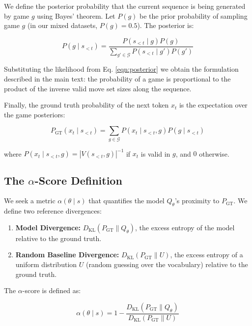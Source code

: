 \documentclass{article}
\theoremstyle{plain}
\theoremstyle{definition}
\theoremstyle{remark}
\begin{document}
We define the posterior probability that the current sequence is being generated by game $g$ using Bayes' theorem. Let $P(g)$ be the prior probability of sampling game $g$ (in our mixed datasets, $P(g) = 0.5$). The posterior is:

\begin{equation}
    P(g \mid s_{<t}) = \frac{P(s_{<t} \mid g) P(g)}{\sum_{g' \in \mathcal{G}} P(s_{<t} \mid g') P(g')}
    \label{eqn:posterior}
\end{equation}

Substituting the likelihood from Eq. \ref{eqn:posterior} we obtain the formulation described in the main text: the probability of a game is proportional to the product of the inverse valid move set sizes along the sequence.

Finally, the ground truth probability of the next token $x_t$ is the expectation over the game posteriors:

\begin{equation}
    P_{\text{GT}}(x_t \mid s_{<t}) = \sum_{g \in \mathcal{G}} P(x_t \mid s_{<t}, g) P(g \mid s_{<t})
\end{equation}

where $P(x_t \mid s_{<t}, g) = |V(s_{<t}, g)|^{-1}$ if $x_t$ is valid in $g$, and $0$ otherwise.

\subsection{The \texorpdfstring{$\alpha$}{alpha}-Score Definition}

We seek a metric $\alpha(\theta \mid s)$ that quantifies the model $Q_\theta$'s proximity to $P_{\text{GT}}$. We define two reference divergences:
\begin{enumerate}
    \item \textbf{Model Divergence:} $D_{\text{KL}}(P_{\text{GT}} \parallel Q_\theta)$, the excess entropy of the model relative to the ground truth.
    \item \textbf{Random Baseline Divergence:} $D_{\text{KL}}(P_{\text{GT}} \parallel U)$, the excess entropy of a uniform distribution $U$ (random guessing over the vocabulary) relative to the ground truth.
\end{enumerate}

The $\alpha$-score is defined as:

\begin{equation}
    \alpha(\theta \mid s) = 1 - \frac{D_{\text{KL}}(P_{\text{GT}} \parallel Q_{\theta})}{D_{\text{KL}}(P_{\text{GT}} \parallel U)}
\end{equation}
\end{document}
